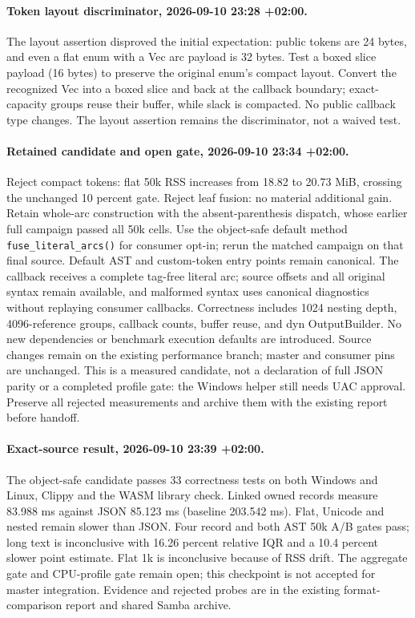 \documentclass[11pt,a4paper]{article}
\begin{document}
\paragraph{Token layout discriminator, 2026-09-10 23:28 +02:00.}
The layout assertion disproved the initial expectation: public tokens are 24 bytes,
and even a flat enum with a Vec arc payload is 32 bytes. Test a boxed slice payload
(16 bytes) to preserve the original enum's compact layout. Convert the recognized
Vec into a boxed slice and back at the callback boundary; exact-capacity groups
reuse their buffer, while slack is compacted. No public callback type changes.
The layout assertion remains the discriminator, not a waived test.

\paragraph{Retained candidate and open gate, 2026-09-10 23:34 +02:00.}
Reject compact tokens: flat 50k RSS increases from 18.82 to 20.73 MiB, crossing
the unchanged 10 percent gate. Reject leaf fusion: no material additional gain.
Retain whole-arc construction with the absent-parenthesis dispatch, whose earlier
full campaign passed all 50k cells. Use the object-safe default method
\texttt{fuse\_literal\_arcs()} for consumer opt-in; rerun the matched campaign on
that final source. Default AST and custom-token entry points remain canonical.
The callback receives a complete tag-free literal arc; source offsets and all
original syntax remain available, and malformed syntax uses canonical diagnostics
without replaying consumer callbacks. Correctness includes 1024 nesting depth,
4096-reference groups, callback counts, buffer reuse, and dyn OutputBuilder.
No new dependencies or benchmark execution defaults are introduced. Source changes
remain on the existing performance branch; master and consumer pins are unchanged.
This is a measured candidate, not a declaration of full JSON parity or a completed
profile gate: the Windows helper still needs UAC approval. Preserve all rejected
measurements and archive them with the existing report before handoff.

\paragraph{Exact-source result, 2026-09-10 23:39 +02:00.}
The object-safe candidate passes 33 correctness tests on both Windows and Linux,
Clippy and the WASM library check. Linked owned records measure 83.988 ms against
JSON 85.123 ms (baseline 203.542 ms). Flat, Unicode and nested remain slower than
JSON. Four record and both AST 50k A/B gates pass; long text is inconclusive with
16.26 percent relative IQR and a 10.4 percent slower point estimate. Flat 1k is
inconclusive because of RSS drift. The aggregate gate and CPU-profile gate remain
open; this checkpoint is not accepted for master integration. Evidence and rejected
probes are in the existing format-comparison report and shared Samba archive.
\end{document}

